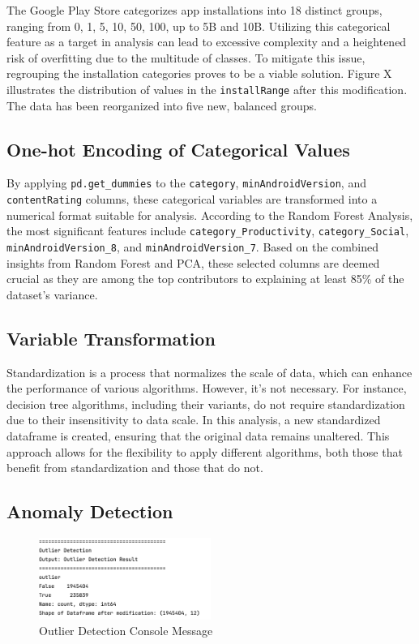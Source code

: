 The Google Play Store categorizes app installations into 18 distinct groups, ranging from 0, 1, 5, 10, 50, 100, up to 5B and 10B. Utilizing this categorical feature as a target in analysis can lead to excessive complexity and a heightened risk of overfitting due to the multitude of classes. To mitigate this issue, regrouping the installation categories proves to be a viable solution. Figure X illustrates the distribution of values in the \texttt{installRange} after this modification. The data has been reorganized into five new, balanced groups.

\subsection{One-hot Encoding of Categorical Values}

By applying \texttt{pd.get\_dummies} to the \texttt{category}, \texttt{minAndroidVersion}, and \texttt{contentRating} columns, these categorical variables are transformed into a numerical format suitable for analysis. According to the Random Forest Analysis, the most significant features include \texttt{category\_Productivity}, \texttt{category\_Social}, \texttt{minAndroidVersion\_8}, and \texttt{minAndroidVersion\_7}. Based on the combined insights from Random Forest and PCA, these selected columns are deemed crucial as they are among the top contributors to explaining at least 85\% of the dataset's variance.

\subsection{Variable Transformation}

Standardization is a process that normalizes the scale of data, which can enhance the performance of various algorithms. However, it's not necessary. For instance, decision tree algorithms, including their variants, do not require standardization due to their insensitivity to data scale. In this analysis, a new standardized dataframe is created, ensuring that the original data remains unaltered. This approach allows for the flexibility to apply different algorithms, both those that benefit from standardization and those that do not.

\subsection{Anomaly Detection}

\begin{figure}[h]
\centering
\includegraphics[width=0.5\textwidth]{docs//assets/outlier.png}
\caption{Outlier Detection Console Message}
\end{figure}

